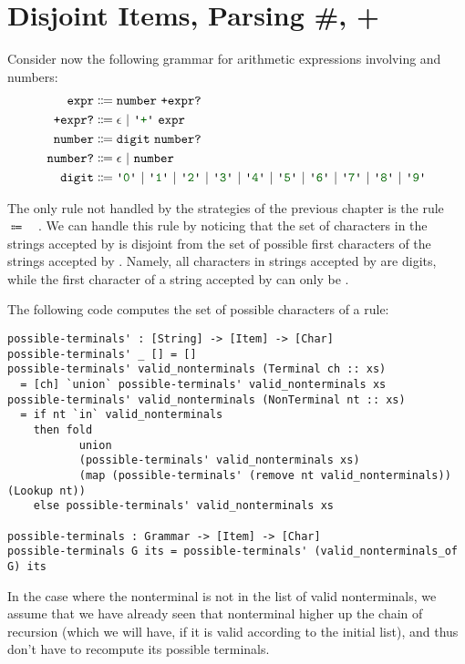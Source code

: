 \chapter{Disjoint Items, Parsing \#, +} \label{ch:disjoint}

  Consider now the following grammar for arithmetic expressions involving \terminal{+} and numbers:
  \begin{align*}
    \nt{expr} & \Coloneqq \nt{number}~\nt{+expr?} \\
    \nt{+expr?} & \Coloneqq \nt{$\epsilon$}~|~\terminal{+}~\nt{expr} \\
    \nt{number} & \Coloneqq \nt{digit}~\nt{number?} \\
    \nt{number?} & \Coloneqq \epsilon~|~\nt{number} \\
    \nt{digit} & \Coloneqq \terminal{0}~|~\terminal{1}~|~\terminal{2}~|~\terminal{3}~|~\terminal{4}~|~\terminal{5}~|~\terminal{6}~|~\terminal{7}~|~\terminal{8}~|~\terminal{9}
  \end{align*}
  
  The only rule not handled by the strategies of the previous chapter is the rule ~$\Coloneqq$~~.  We can handle this rule by noticing that the set of characters in the strings accepted by  is disjoint from the set of possible first characters of the strings accepted by .  Namely, all characters in strings accepted by  are digits, while the first character of a string accepted by  can only be \terminal{+}.
  
  The following code computes the set of possible characters of a rule:
\begin{verbatim}
possible-terminals' : [String] -> [Item] -> [Char]
possible-terminals' _ [] = []
possible-terminals' valid_nonterminals (Terminal ch :: xs)
  = [ch] `union` possible-terminals' valid_nonterminals xs
possible-terminals' valid_nonterminals (NonTerminal nt :: xs)
  = if nt `in` valid_nonterminals
    then fold
           union
           (possible-terminals' valid_nonterminals xs)
           (map (possible-terminals' (remove nt valid_nonterminals)) (Lookup nt))
    else possible-terminals' valid_nonterminals xs

possible-terminals : Grammar -> [Item] -> [Char]
possible-terminals G its = possible-terminals' (valid_nonterminals_of G) its
\end{verbatim}
    In the case where the nonterminal is not in the list of valid nonterminals, we assume that we have already seen that nonterminal higher up the chain of recursion (which we will have, if it is valid according to the initial list), and thus don't have to recompute its possible terminals.

